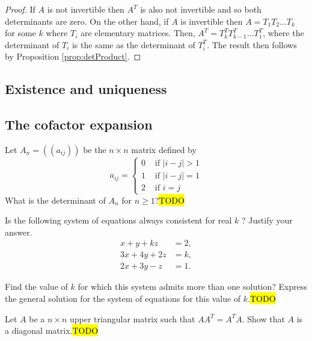 \begin{proof}
If $A$ is not invertible then $A^{T}$ is also not invertible and
so both determinants are zero. On the other hand, if $A$ is invertible
then $A=T_{1}T_{2}\ldots T_{k}$ for some $k$ where $T_{i}$ are
elementary matrices. Then, $A^{T}=T_{k}^{T}T_{k-1}^{T}\ldots T_{1}^{T}$,
where the determinant of $T_{i}$ is the same as the determinant of
$T_{i}^{T}$. The result then follows by Proposition \ref{prop:detProduct}.
\end{proof}

\subsection{Existence and uniqueness}

\subsection{The cofactor expansion}
\begin{example}
\label{exa:isi2023psb1}Let $A_{n}=\left(\left(a_{ij}\right)\right)$
be the $n\times n$ matrix defined by 
\[
a_{ij}=\begin{cases}
0 & \text{ if }|i-j|>1\\
1 & \text{ if }|i-j|=1\\
2 & \text{ if }i=j
\end{cases}
\]
What is the determinant of $A_{n}$ for $n\geq1$?\hl{TODO}
\end{example}

\begin{example}
\label{exa:isi2004psbsample2}Is the following system of equations
always consistent for real $k$ ? Justify your answer. 
\[
\begin{aligned}x+y+kz & =2,\\
3x+4y+2z & =k,\\
2x+3y-z & =1.
\end{aligned}
\]

Find the value of $k$ for which this system admits more than one
solution? Express the general solution for the system of equations
for this value of $k$.\hl{TODO}
\end{example}

\begin{example}
\label{exa:isi2005samplepsb1}Let $A$ be a $n\times n$ upper triangular
matrix such that $AA^{T}=A^{T}A$. Show that $A$ is a diagonal matrix.\hl{TODO}
\end{example}


